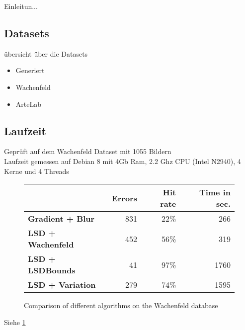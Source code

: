 Einleitun...
\subsection{Datasets}
übersicht über die Datasets
\begin{itemize}
\item Generiert
\item Wachenfeld \cite{wachenfeld2008robust}
\item ArteLab \cite{zamberletti2010neural} \cite{zamberletti2013robust}
\end{itemize}
\subsection{Laufzeit}
Geprüft auf dem Wachenfeld Dataset mit 1055 Bildern \cite{wachenfeld2008robust}\\
Laufzeit gemessen auf Debian 8 mit 4Gb Ram, 2.2 Ghz CPU (Intel N2940), 4 Kerne und 4 Threads

\begin{figure}[t]
\center
\bgroup
\def\arraystretch{1.5}
\begin{tabular}{|l|r|r|r|}
\hline
&\textbf{Errors}&\textbf{Hit rate}&\textbf{Time in sec.}\\
\hline
\textbf{Gradient + Blur}& 831& 22\%& 266\\
\hline
\textbf{LSD + Wachenfeld}& 452& 56\%& 319\\
\hline
\textbf{LSD + LSDBounds}& 41& 97\%& 1760\\
\hline
\textbf{LSD + Variation}& 279& 74\%& 1595\\
\hline
\end{tabular}
\egroup
\caption{Comparison of different algorithms on the Wachenfeld database \citep{wachenfeld2008robust}}
\label{laufzeit}
\end{figure}
Siehe \cref{laufzeit}
 